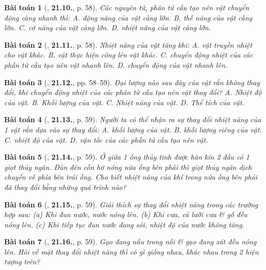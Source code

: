 \documentclass{article}
\numberwithin{equation}{section}
\newtheorem{baitoan}{Bài toán}
\begin{document}
\begin{baitoan}[\cite{SBT_Vat_Ly_8}, \textbf{21.10.}, p. 58]
	Các nguyên tử, phân tử cấu tạo nên vật chuyển động càng nhanh thì: {\sf A.} động năng của vật càng lớn. {\sf B.} thế năng của vật càng lớn. {\sf C.} cơ năng của vật càng lớn. {\sf D.} nhiệt năng của vật càng lớn.
\end{baitoan}

\begin{baitoan}[\cite{SBT_Vat_Ly_8}, \textbf{21.11.}, p. 58]
	Nhiệt năng của vật tăng khi: {\sf A.} vật truyền nhiệt cho vật khác. {\sf B.} vật thực hiện công lên vật khác. {\sf C.} chuyển động nhiệt của các phần tử cấu tạo nên vật nhanh lên. {\sf D.} chuyển động của vật nhanh lên.
\end{baitoan}

\begin{baitoan}[\cite{SBT_Vat_Ly_8}, \textbf{21.12.}, pp. 58--59]
	Đại lượng nào sau đây của vật rắn không thay đổi, khi chuyển động nhiệt của các phân tử cấu tạo nên vật thay đổi? {\sf A.} Nhiệt độ của vật. {\sf B.} Khối lượng của vật. {\sf C.} Nhiệt năng của vật. {\sf D.} Thể tích của vật.
\end{baitoan}

\begin{baitoan}[\cite{SBT_Vat_Ly_8}, \textbf{21.13.}, p. 59]
	Người ta có thể nhận ra sự thay đổi nhiệt năng của 1 vật rắn dựa vào sự thay đổi: {\sf A.} khối lượng của vật. {\sf B.} khối lượng riêng của vật. {\sf C.} nhiệt độ của vật. {\sf D.} vận tốc của các phần tử cấu tạo nên vật.
\end{baitoan}

\begin{baitoan}[\cite{SBT_Vat_Ly_8}, \textbf{21.14.}, p. 59]
	Ở giữa 1 ống thủy tinh được hàn kín 2 đầu có 1 giọt thủy ngân. Dùn đèn cồn hơ nóng nửa ống bên phải thì giọt thủy ngân dịch chuyển vế phía bên trái ống. Cho biết nhiệt năng của khí trong nửa ống bên phải đã thay đổi bằng những quá trình nào?
\end{baitoan}

\begin{baitoan}[\cite{SBT_Vat_Ly_8}, \textbf{21.15.}, p. 59]
	Giải thích sự thay đổi nhiệt năng trong các trường hợp sau: (a) Khi đun nước, nước nóng lên. (b) Khi cưa, cả lưỡi cưa \& gỗ đều nóng lên. (c) Khi tiếp tục đun nước đang sôi, nhiệt độ của nước không tăng.
\end{baitoan}

\begin{baitoan}[\cite{SBT_Vat_Ly_8}, \textbf{21.16.}, p. 59]
	Gạo đang nấu trong nồi \& gạo đang xát đều nóng lên. Hỏi về mặt thay đổi nhiệt năng thì có gì giống nhau, khác nhau trong 2 hiện tượng trên?
\end{baitoan}
\end{document}
